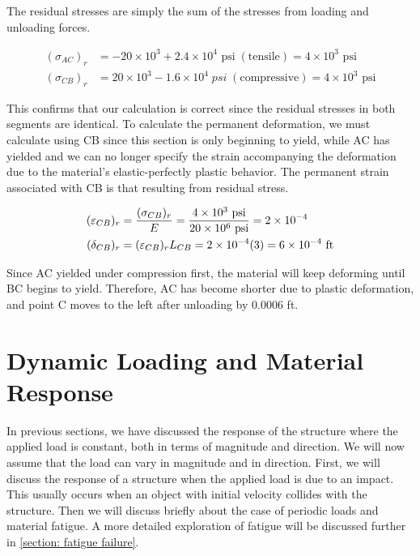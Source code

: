 \documentclass[
10pt,
a4paper,
openany,
svgnames,
]{book} %
\begin{document}
\begin{solution}
  The residual stresses are simply the sum of the stresses from loading and unloading forces.
  
  \begin{align*}
    ({\sigma _{AC}})_r &=  - 20 \times {10^3} + 2.4 \times {10^4} \text{ psi}\;({\text{tensile}}) = 4 \times 10^3 \text{ psi}  \\
    ({\sigma _{CB}})_r &= 20 \times {10^3} - 1.6 \times {10^4}\;psi\;({\text{compressive}}) = 4 \times 10^3 \text{ psi}
  \end{align*}	
  
  This confirms that our calculation is correct since the residual stresses in both segments are identical.
  To calculate the permanent deformation, we must calculate using CB since this section is only beginning to yield, while AC has yielded and we can no longer specify the strain accompanying the deformation due to the material’s elastic-perfectly plastic behavior. The permanent strain associated with CB is that resulting from residual stress.
  
  \begin{align*}
    (\varepsilon_{CB})_r &= \frac{(\sigma_{CB})_r}{E} = \frac{4 \times 10^3 \text{ psi}}{20 \times 10^6 \text{ psi}} = 2 \times 10^{-4} \hfill \\
    (\delta _{CB})_r &= (\varepsilon_{CB})_rL_{CB} = 2 \times 10^{-4}(3) = 6 \times 10^{-4} \text{ ft} \hfill 
  \end{align*}	
  
  Since AC yielded under compression first, the material will keep deforming until BC begins to yield. Therefore, AC has become shorter due to plastic deformation, and point C moves to the left after unloading by 0.0006 ft.
  
\end{solution}

\section{Dynamic Loading and Material Response}

In previous sections, we have discussed the response of the structure where the applied load is constant, both in terms of magnitude and direction. We will now assume that the load can vary in magnitude and in direction. First, we will discuss the response of a structure when the applied load is due to an impact. This usually occurs when an object with initial velocity collides with the structure. Then we will discuss briefly about the case of periodic loads and material fatigue. A more detailed exploration of fatigue will be discussed further in \cref{section: fatigue failure}.
\end{document}
